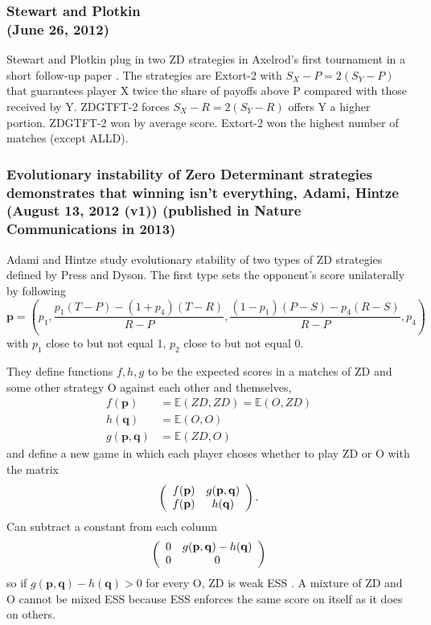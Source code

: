\subsubsection{Stewart and Plotkin \cite{Stewart26062012}
\\(June 26, 2012)}
Stewart and Plotkin plug in two ZD strategies in Axelrod's first tournament in a short follow-up paper \cite{Stewart26062012}. The strategies are Extort-2 with $S_X - P = 2(S_Y - P)$ that guarantees player X twice the share of payoffs above P compared with those received by Y. ZDGTFT-2 forces $S_X - R = 2(S_Y - R)$ offers Y a higher portion. ZDGTFT-2 won by average score. Extort-2 won the highest number of matches (except ALLD).

\subsubsection{Evolutionary instability of Zero Determinant strategies demonstrates that winning isn't everything, Adami, Hintze \cite{Adami_Hintze_2014}
\\(August 13, 2012 (v1)) (published in Nature Communications in 2013)}

Adami and Hintze study evolutionary stability of two types of ZD strategies defined by Press and Dyson. The first type sets the opponent's score unilaterally by following 
\[
\mathbf{p} = \left(p_1, \frac{p_1(T-P) - (1+p_4)(T-R)}{R-P}, \frac{(1-p_1)(P-S) - p_4(R-S)}{R-P}, p_4\right)
\]
with $p_1$ close to but not equal 1, $p_2$ close to but not equal 0.

They define functions $f, h, g$ to be the expected scores in a matches of ZD and some other strategy O against each other and themselves,
\begin{align*}
f(\mathbf{p})&=\mathbb{E}(ZD, ZD) = \mathbb{E}(O, ZD)\\
h(\mathbf{q}) &= \mathbb{E}(O, O)\\
g(\mathbf{p}, \mathbf{q}) &= \mathbb{E}(ZD, O)
\end{align*}
and define a new game in which each player choses whether to play ZD or O with the matrix
\[
\left(
\begin{array}{c c}
f(\mathbf{p}) & g(\mathbf{p}, \mathbf{q}) \\
f(\mathbf{p}) & h(\mathbf{q})
\end{array}
\right)
.\]
Can subtract a constant from each column 
\[
\left(
\begin{array}{c c}
0 & g(\mathbf{p}, \mathbf{q}) - h(\mathbf{q}) \\
0 & 0
\end{array}
\right)
\]
so if $g(\mathbf{p}, \mathbf{q}) - h(\mathbf{q}) > 0$ for every O, ZD is weak ESS . A mixture of ZD and O cannot be mixed ESS because ESS enforces the same score on itself as it does on others.

